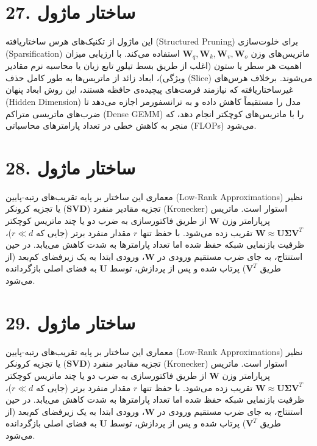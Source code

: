 \documentclass[12pt,a4paper]{report}
\begin{document}
\section*{27. ساختار ماژول }
این ماژول از تکنیک‌های هرس ساختاریافته (Structured Pruning) برای خلوت‌سازی (Sparsification) ماتریس‌های وزن $\mathbf{W}_q, \mathbf{W}_k, \mathbf{W}_v, \mathbf{W}_o$ استفاده می‌کند. با ارزیابی میزان اهمیت هر سطر یا ستون (اغلب از طریق بسط تیلورِ تابع زیان یا محاسبه نرم مقادیر ویژگی)، ابعاد زائد از ماتریس‌ها به طور کامل حذف (Slice) می‌شوند. برخلاف هرس‌های غیرساختاریافته که نیازمند فرمت‌های پیچیده‌ی حافظه هستند، این روش ابعاد پنهان (Hidden Dimension) مدل را مستقیماً کاهش داده و به ترانسفورمر اجازه می‌دهد تا ضرب‌های ماتریسی متراکم (Dense GEMM) را با ماتریس‌های کوچکتر انجام دهد، که منجر به کاهش خطی در تعداد پارامترهای محاسباتی (FLOPs) می‌شود.

\section*{28. ساختار ماژول }
معماری این ساختار بر پایه تقریب‌های رتبه-پایین (Low-Rank Approximations) نظیر تجزیه مقادیر منفرد ($\mathbf{SVD}$) یا تجزیه کرونکر (Kronecker) استوار است. ماتریس پرپارامتر وزن $\mathbf{W}$ از طریق فاکتورسازی به ضرب دو یا چند ماتریس کوچکتر $\mathbf{W} \approx \mathbf{U} \mathbf{\Sigma} \mathbf{V}^T$ تقریب زده می‌شود. با حفظ تنها $r$ مقدار منفرد برتر (جایی که $r \ll d$)، ظرفیت بازنمایی شبکه حفظ شده اما تعداد پارامترها به شدت کاهش می‌یابد. در حین استنتاج، به جای ضرب مستقیم ورودی در $\mathbf{W}$، ورودی ابتدا به یک زیرفضای کم‌بعد (از طریق $\mathbf{V}^T$) پرتاب شده و پس از پردازش، توسط $\mathbf{U}$ به فضای اصلی بازگردانده می‌شود.

\section*{29. ساختار ماژول }
معماری این ساختار بر پایه تقریب‌های رتبه-پایین (Low-Rank Approximations) نظیر تجزیه مقادیر منفرد ($\mathbf{SVD}$) یا تجزیه کرونکر (Kronecker) استوار است. ماتریس پرپارامتر وزن $\mathbf{W}$ از طریق فاکتورسازی به ضرب دو یا چند ماتریس کوچکتر $\mathbf{W} \approx \mathbf{U} \mathbf{\Sigma} \mathbf{V}^T$ تقریب زده می‌شود. با حفظ تنها $r$ مقدار منفرد برتر (جایی که $r \ll d$)، ظرفیت بازنمایی شبکه حفظ شده اما تعداد پارامترها به شدت کاهش می‌یابد. در حین استنتاج، به جای ضرب مستقیم ورودی در $\mathbf{W}$، ورودی ابتدا به یک زیرفضای کم‌بعد (از طریق $\mathbf{V}^T$) پرتاب شده و پس از پردازش، توسط $\mathbf{U}$ به فضای اصلی بازگردانده می‌شود.
\end{document}
